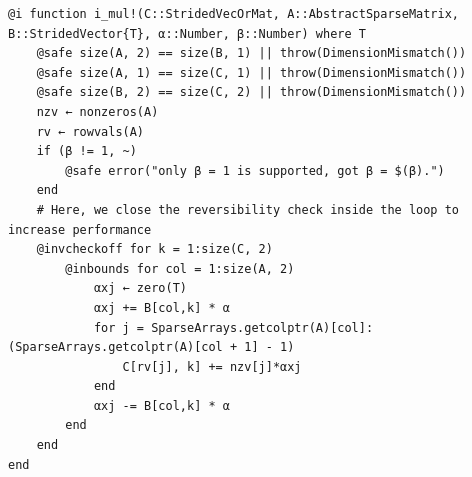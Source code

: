 \documentclass{article}
\newcommand{\<}{\langle}
\renewcommand{\>}{\rangle}
\newcommand{\ra}[1]{\renewcommand{\arraystretch}{#1}}
\theoremstyle{definition}\newtheorem{definition}{\textit{Definition}}
\begin{document}
\begin{minipage}{.88\textwidth}
\begin{lstlisting}[mathescape=false,caption={Reversible sparse matrix dot-product.},label={lst:sparse-dot}, frame=tlrb]
@i function i_mul!(C::StridedVecOrMat, A::AbstractSparseMatrix, B::StridedVector{T}, α::Number, β::Number) where T
    @safe size(A, 2) == size(B, 1) || throw(DimensionMismatch())
    @safe size(A, 1) == size(C, 1) || throw(DimensionMismatch())
    @safe size(B, 2) == size(C, 2) || throw(DimensionMismatch())
    nzv ← nonzeros(A)
    rv ← rowvals(A)
    if (β != 1, ~)
        @safe error("only β = 1 is supported, got β = $(β).")
    end
    # Here, we close the reversibility check inside the loop to increase performance
    @invcheckoff for k = 1:size(C, 2)
        @inbounds for col = 1:size(A, 2)
            αxj ← zero(T)
            αxj += B[col,k] * α
            for j = SparseArrays.getcolptr(A)[col]:(SparseArrays.getcolptr(A)[col + 1] - 1)
                C[rv[j], k] += nzv[j]*αxj
            end
            αxj -= B[col,k] * α
        end
    end
end
\end{lstlisting}
\end{minipage}

\begin{table}[h!]\centering
\begin{minipage}{0.8\columnwidth}
\ra{1.3}
    \caption{Absolute runtimes in seconds for computing the objectives (O) and the backward pass (B) of sparse matrix operations. The matrix size is $1000 \times 1000$, and the element density is $0.05$. The total time for computing gradients can be estimated by summing ``O'' and ``B''.
    }\label{tbl:sparse}
\end{minipage}
\end{table}
\end{document}
